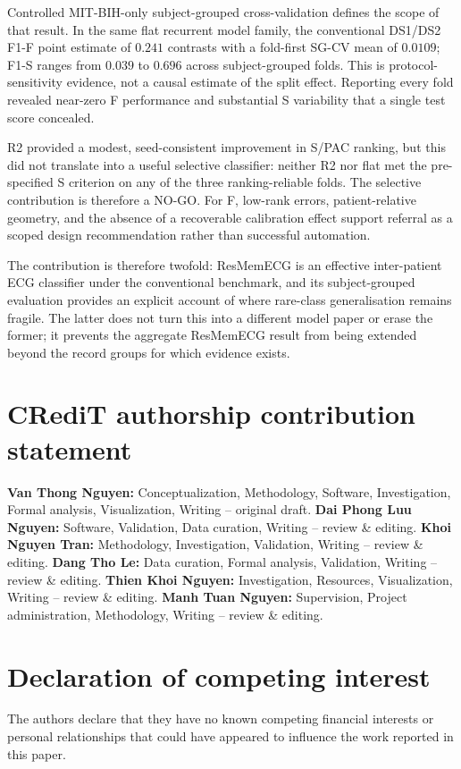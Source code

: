 \documentclass[review,12pt]{elsarticle}
\begin{document}
Controlled MIT-BIH-only subject-grouped cross-validation defines the scope of
that result. In the same flat recurrent model family, the conventional DS1/DS2
F1-F point estimate of $0.241$ contrasts with a fold-first SG-CV mean of
$0.0109$; F1-S ranges from $0.039$ to $0.696$ across subject-grouped folds.
This is protocol-sensitivity evidence, not a causal estimate of the split effect.
Reporting every fold revealed near-zero F performance and substantial S
variability that a single test score concealed.

R2 provided a modest, seed-consistent improvement in S/PAC ranking, but this did
not translate into a useful selective classifier: neither R2 nor flat met the
pre-specified S criterion on any of the three ranking-reliable folds. The
selective contribution is therefore a NO-GO. For F, low-rank errors,
patient-relative geometry, and the absence of a recoverable calibration effect
support referral as a scoped design recommendation rather than successful
automation.

The contribution is therefore twofold: ResMemECG is an effective inter-patient
ECG classifier under the conventional benchmark, and its subject-grouped
evaluation provides an explicit account of where rare-class generalisation
remains fragile. The latter does not turn this into a different model paper or
erase the former; it prevents the aggregate ResMemECG result from being
extended beyond the record groups for which evidence exists.

\section*{CRediT authorship contribution statement}
\textbf{Van Thong Nguyen:} Conceptualization, Methodology, Software,
Investigation, Formal analysis, Visualization, Writing -- original draft.
\textbf{Dai Phong Luu Nguyen:} Software, Validation, Data curation, Writing --
review \& editing.
\textbf{Khoi Nguyen Tran:} Methodology, Investigation, Validation, Writing --
review \& editing.
\textbf{Dang Tho Le:} Data curation, Formal analysis, Validation, Writing --
review \& editing.
\textbf{Thien Khoi Nguyen:} Investigation, Resources, Visualization, Writing --
review \& editing.
\textbf{Manh Tuan Nguyen:} Supervision, Project administration, Methodology,
Writing -- review \& editing.

\section*{Declaration of competing interest}
The authors declare that they have no known competing financial interests or
personal relationships that could have appeared to influence the work reported
in this paper.
\end{document}
